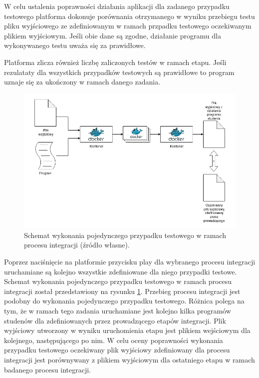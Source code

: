 W celu ustalenia poprawności działania aplikacji dla zadanego przypadku testowego platforma dokonuje porównania otrzymanego w wyniku przebiegu testu pliku wyjściowego ze zdefiniowanym w ramach przpadku testowego oczekiwanym plikiem wyjściowym.
Jeśli obie dane są zgodne, działanie programu dla wykonywanego testu uważa się za prawidłowe.

Platforma zlicza również liczbę zaliczonych testów w ramach etapu.
Jeśli rezulataty dla wszystkich przypadków testowych są prawidłowe to program uznaje się za ukończony w ramach danego zadania.

\begin{figure}[h]
    \centering
    \includegraphics[width = 12cm]{chapter02/integration.png}
    \caption{Schemat wykonania pojedynczego przypadku testowego w ramach procesu integracji (źródło własne).}
    \label{fig:integration}
\end{figure}

Poprzez naciśnięcie na platformie przycisku play dla wybranego procesu integracji uruchamiane są kolejno wszystkie zdefiniowane dla niego przypadki testowe.
Schemat wykonania pojedynczego przypadku testowego w ramach procesu integracji został przedstawiony na rysunku \ref{fig:integration}.
Przebieg procesu integracji jest podobny do wykonania pojedynczego przypadku testowego.
Różnica polega na tym, że w ramach tego zadania uruchamiane jest kolejno kilka programów studenów dla zdefiniowanych przez prowadzącego etapów integracji.
Plik wyjściowy utworzony w wyniku uruchomienia etapu jest plikiem wejściowym dla kolejnego, następującego po nim.
W celu oceny poprawności wykonania przypadku testowego oczekiwany plik wyjściowy zdefiniowany dla procesu integracji jest porównywany z plikiem wyjściowym dla ostatniego etapu w ramach badanego procesu integracji.

